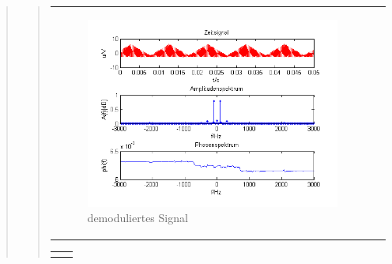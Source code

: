 \begin{quote}
\begin{quote}
\begin{center}
\begin{tabular}{ll}
            \begin{minipage}{0.67\textwidth}
                \begin{figure}[H]
                    \label{fig:DemodreieckoT2}
                    \includegraphics[scale=0.7]{Bilder/Demo_Dre_2k_100Hz_mo_ohneTiefpass}
                    \caption{demoduliertes Signal}
                \end{figure}
        
            \end{minipage}
        
        \end{tabular}
        \end{center}
        
         \begin{center}
        \begin{tabular}{ll}
        
        \hspace{-5cm}
            \begin{minipage}{0.67\textwidth}
                

\end{minipage}
\end{tabular}
\end{center}
\end{quote}
\end{quote}
